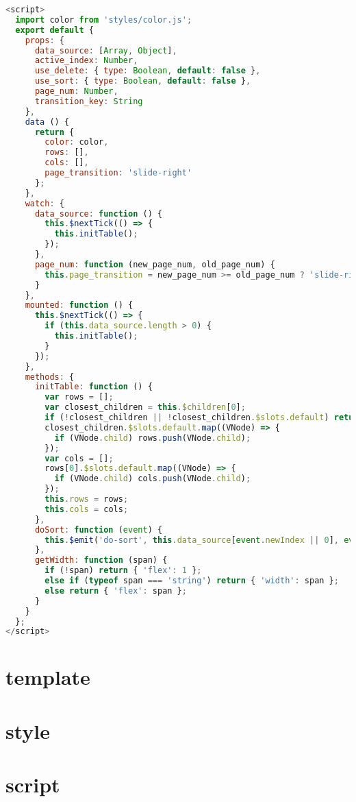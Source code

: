 \begin{lstlisting}[language=JavaScript]
<script>
  import color from 'styles/color.js';
  export default {
    props: {
      data_source: [Array, Object],
      active_index: Number,
      use_delete: { type: Boolean, default: false },
      use_sort: { type: Boolean, default: false },
      page_num: Number,
      transition_key: String
    },
    data () {
      return {
        color: color,
        rows: [],
        cols: [],
        page_transition: 'slide-right'
      };
    },
    watch: {
      data_source: function () {
        this.$nextTick(() => {
          this.initTable();
        });
      },
      page_num: function (new_page_num, old_page_num) {
        this.page_transition = new_page_num >= old_page_num ? 'slide-right' : 'slide-left';
      }
    },
    mounted: function () {
      this.$nextTick(() => {
        if (this.data_source.length > 0) {
          this.initTable();
        }
      });
    },
    methods: {
      initTable: function () {
        var rows = [];
        var closest_children = this.$children[0];
        if (!closest_children || !closest_children.$slots.default) return;
        closest_children.$slots.default.map((VNode) => {
          if (VNode.child) rows.push(VNode.child);
        });
        var cols = [];
        rows[0].$slots.default.map((VNode) => {
          if (VNode.child) cols.push(VNode.child);
        });
        this.rows = rows;
        this.cols = cols;
      },
      doSort: function (event) {
        this.$emit('do-sort', this.data_source[event.newIndex || 0], event.newIndex || 0, event.oldIndex);
      },
      getWidth: function (span) {
        if (!span) return { 'flex': 1 };
        else if (typeof span === 'string') return { 'width': span };
        else return { 'flex': span };
      }
    }
  };
</script>
\end{lstlisting}


\section{template}



\section{style}



\section{script}


